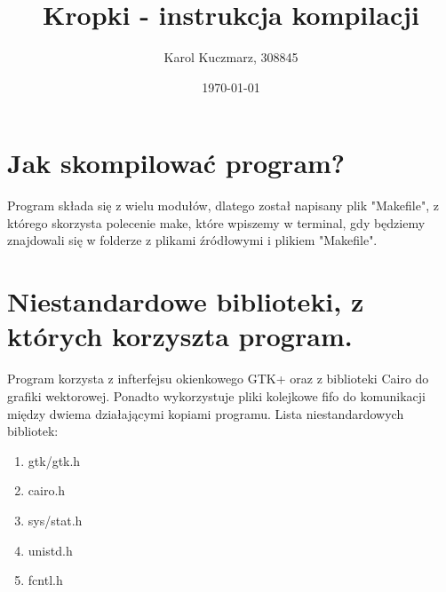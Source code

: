 \documentclass[a4paper]{article}
\author{Karol Kuczmarz, 308845}
\title{Kropki - instrukcja kompilacji}
\date{\today}
\begin{document}
\maketitle
\section{Jak skompilować program?}
Program składa się z wielu modułów, dlatego został napisany plik "Makefile", z którego skorzysta polecenie make, które wpiszemy w terminal, gdy będziemy znajdowali się w folderze z plikami źródłowymi i plikiem "Makefile".
\section{Niestandardowe biblioteki, z których korzyszta program.}
Program korzysta z infterfejsu okienkowego GTK+ oraz z biblioteki Cairo do grafiki wektorowej. Ponadto wykorzystuje pliki kolejkowe fifo do komunikacji między dwiema działającymi kopiami programu.
Lista niestandardowych bibliotek:
\begin{enumerate}
\item gtk/gtk.h
\item cairo.h
\item sys/stat.h
\item unistd.h
\item fcntl.h
\end{enumerate}
\end{document}

